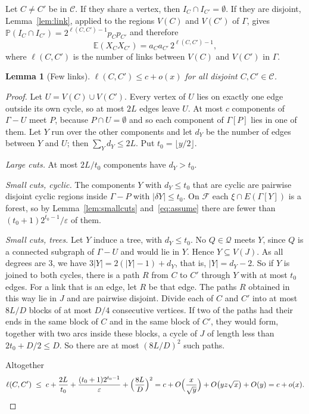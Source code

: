 \documentclass[11pt]{article}
\newtheorem{lemma}[theorem]{Lemma}
\theoremstyle{definition}
\theoremstyle{remark}
\newcommand{\PP}{\mathbb{P}}
\newcommand{\EE}{\mathbb{E}}
\begin{document}
Let $C\ne C'$ be in $\mathcal{C}$. If they share a vertex, then $I_C\cap I_{C'}=\emptyset$. If they
are disjoint, Lemma~\ref{lem:link}, applied to the regions $V(C)$ and $V(C')$ of $\Gamma$, gives
$\PP(I_C\cap I_{C'})=2^{\ell(C,C')-1}p_Cp_{C'}$ and therefore
\begin{equation}\label{eq:pair}
  \EE(X_CX_{C'})=a_Ca_{C'}\,2^{\ell(C,C')-1},
\end{equation}
where $\ell(C,C')$ is the number of links between $V(C)$ and $V(C')$ in $\Gamma$.

\begin{lemma}[Few links]\label{lem:links}
$\ell(C,C')\le c+o(x)$ for all disjoint $C,C'\in\mathcal{C}$.
\end{lemma}

\begin{proof}
Let $U=V(C)\cup V(C')$. Every vertex of $U$ lies on exactly one edge outside its own cycle, so at
most $2L$ edges leave $U$. At most $c$ components of $\Gamma-U$ meet $P$, because $P\cap U=\emptyset$
and so each component of $\Gamma[P]$ lies in one of them. Let $Y$ run over the other components and
let $d_Y$ be the number of edges between $Y$ and $U$; then $\sum_Yd_Y\le2L$. Put
$t_0=\lfloor y/2\rfloor$.

\emph{Large cuts.} At most $2L/t_0$ components have $d_Y>t_0$.

\emph{Small cuts, cyclic.} The components $Y$ with $d_Y\le t_0$ that are cyclic are pairwise
disjoint cyclic regions inside $\Gamma-P$ with $|\delta Y|\le t_0$. On $\mathcal{F}$ each
$\xi\cap E(\Gamma[Y])$ is a forest, so by Lemma~\ref{lem:smallcuts} and~\eqref{eq:assume} there are
fewer than $(t_0+1)2^{t_0-1}/\varepsilon$ of them.

\emph{Small cuts, trees.} Let $Y$ induce a tree, with $d_Y\le t_0$. No $Q\in\mathcal{Q}$ meets $Y$,
since $Q$ is a connected subgraph of $\Gamma-U$ and would lie in $Y$. Hence $Y\subseteq V(J)$. As
all degrees are $3$, we have $3|Y|=2(|Y|-1)+d_Y$, that is, $|Y|=d_Y-2$. So if $Y$ is joined to both
cycles, there is a path $R$ from $C$ to $C'$ through $Y$ with at most $t_0$ edges. For a link that
is an edge, let $R$ be that edge. The paths $R$ obtained in this way lie in $J$ and are pairwise
disjoint. Divide each of $C$ and $C'$ into at most $8L/D$ blocks of at most $D/4$ consecutive
vertices. If two of the paths had their ends in the same block of $C$ and in the same block of $C'$,
they would form, together with two arcs inside these blocks, a cycle of $J$ of length less than
$2t_0+D/2\le D$. So there are at most $(8L/D)^{2}$ such paths.

Altogether
\[
  \ell(C,C')\;\le\;c+\frac{2L}{t_0}+\frac{(t_0+1)2^{t_0-1}}{\varepsilon}+\Bigl(\frac{8L}{D}\Bigr)^{2}
  =c+O\Bigl(\frac{x}{\sqrt y}\Bigr)+O\bigl(yz\sqrt x\bigr)+O(y)=c+o(x).\qedhere
\]
\end{proof}
\end{document}

